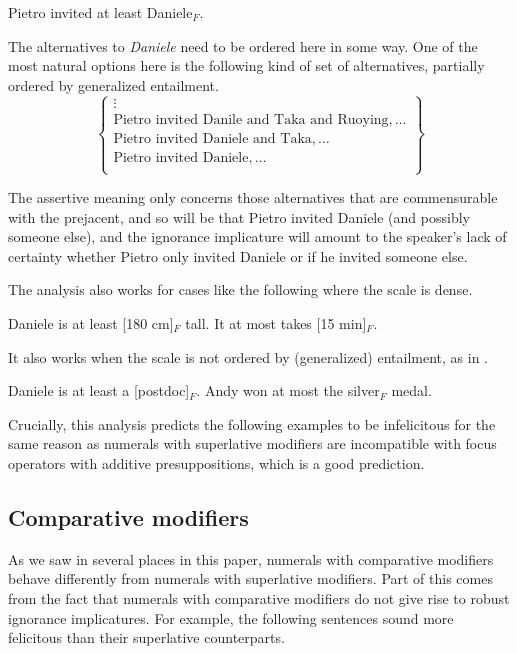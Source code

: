 \documentclass[output=paper]{langscibook}
\begin{document}
\ea Pietro invited at least Daniele$_F$.\z

\noindent The alternatives to \textit{Daniele} need to be ordered here in some way. One of the most natural options here is the following kind of set of alternatives, partially ordered by generalized entailment.
\[
\left\{\begin{array}{l}
  \vdots\\
  \text{Pietro invited Danile and Taka and Ruoying}, \dots\\
  \text{Pietro invited Daniele and Taka}, \dots\\
\text{Pietro invited Daniele},\dots\\
\end{array}\right\}
\]

\noindent The assertive meaning only concerns those alternatives that are commensurable with the prejacent, and so will be that Pietro invited Daniele (and possibly someone else), and the ignorance implicature will amount to  the speaker's lack of certainty whether Pietro only invited Daniele or if he invited someone else.

The analysis also works for cases like the following where the scale is dense.

\ea
  \ea Daniele is at least [180 cm]$_F$ tall.
  \ex It at most takes [15 min]$_F$.
  \z
\z

\noindent It also works when the scale is not ordered by (generalized) entailment, as in .

\ea\label{don-sud:rank}
  \ea Daniele is at least a [postdoc]$_F$.
  \ex Andy won at most the silver$_F$ medal.
  \z
\z

\noindent Crucially, this analysis predicts the following examples to be infelicitous for the same reason as numerals with superlative modifiers are incompatible with focus operators with additive presuppositions, which is a good prediction.

\ea
  \z
\z

\subsection{Comparative modifiers}

As we saw in several places in this paper, numerals with comparative modifiers behave differently from numerals with superlative modifiers. Part of this comes from the fact that numerals with comparative modifiers do not give rise to robust ignorance implicatures. For example, the following sentences sound more felicitous than their superlative counterparts.
\end{document}
